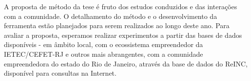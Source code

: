 A proposta de método da tese é fruto dos estudos conduzidos e das interações com a comunidade. O detalhamento do método e o desenvolvimento da ferramenta estão planejados para serem realizados ao longo deste ano. Para avaliar a proposta, esperamos realizar experimentos a partir das bases de dados disponíveis - em âmbito local, com o ecossistema empreendedor da IETEC/CEFET-RJ e outros mais abrangentes, com a comunidade empreendedora do estado do Rio de  Janeiro, através da base de dados do ReINC, disponível para consultas na Internet.










